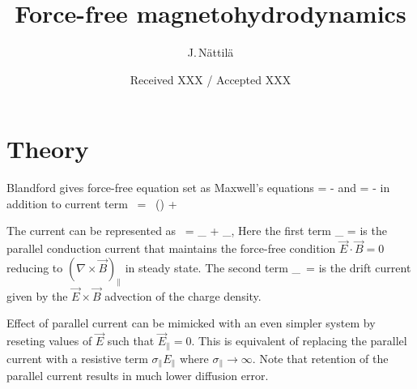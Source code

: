 \documentclass{aa}
\begin{document}
\title{Force-free magnetohydrodynamics}

\author{J.\,N\"attil\"a}

\date{Received XXX / Accepted XXX}




\maketitle

\section{Theory}\label{sec:theory}

Blandford gives force-free equation set as Maxwell's equations
\be
{}  = \nabla \times {}
-  
\ee
and
\be
{}  = -\nabla \times {}
\ee
in addition to current term
\be
{} =  (\nabla \cdot {})  
+   
\ee


The current can be represented as
\be
{} = _{\parallel} + _{},
\ee
Here the first term  
\be
{}_{\parallel} =   
\ee
is the parallel conduction current that maintains the force-free condition $\vec{E} \cdot \vec{B} = 0$ reducing to $(\nabla \times \vec{B})_{\parallel}$ in steady state.
The second term
\be
{}_{} = \nabla \cdot {} 
\ee
is the drift current given by the $\vec{E} \times \vec{B}$ advection of the charge density.

Effect of parallel current can be mimicked with an even simpler system by reseting values of $\vec{E}$ such that $\vec{E}_{\parallel}=0$.
This is equivalent of replacing the parallel current with a resistive term $\sigma_{\parallel} E_{\parallel}$ where $\sigma_{\parallel} \rightarrow \infty$.
Note that retention of the parallel current results in much lower diffusion error.
\end{document}

